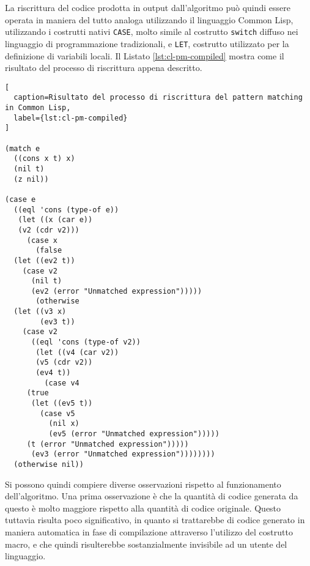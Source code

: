 La riscrittura del codice prodotta in output dall'algoritmo può quindi essere
operata in maniera del tutto analoga utilizzando il linguaggio Common Lisp,
utilizzando i costrutti nativi \texttt{CASE}, molto simile al costrutto
\texttt{switch} diffuso nei linguaggio di programmazione tradizionali, e
\texttt{LET}, costrutto utilizzato per la definizione di variabili locali. Il
Listato \ref{lst:cl-pm-compiled} mostra come il risultato del processo di
riscrittura appena descritto.

\newpage


\begin{lstlisting}[
  caption=Risultato del processo di riscrittura del pattern matching in Common Lisp,
  label={lst:cl-pm-compiled}
]

(match e
  ((cons x t) x)
  (nil t)
  (z nil))

(case e
  ((eql 'cons (type-of e))
   (let ((x (car e))
   (v2 (cdr v2)))
     (case x
       (false
  (let ((ev2 t))
    (case v2
      (nil t)
      (ev2 (error "Unmatched expression")))))
       (otherwise
  (let ((v3 x)
        (ev3 t))
    (case v2
      ((eql 'cons (type-of v2))
       (let ((v4 (car v2))
       (v5 (cdr v2))
       (ev4 t))
         (case v4
     (true
      (let ((ev5 t))
        (case v5
          (nil x)
          (ev5 (error "Unmatched expression")))))
     (t (error "Unmatched expression")))))
      (ev3 (error "Unmatched expression"))))))))
  (otherwise nil))

\end{lstlisting}

\newpage

Si possono quindi compiere diverse osservazioni rispetto al funzionamento
dell'algoritmo. Una prima osservazione è che la quantità di codice generata da
questo è molto maggiore rispetto alla quantità di codice originale. Questo
tuttavia risulta poco significativo, in quanto si trattarebbe di codice generato
in maniera automatica in fase di compilazione attraverso l'utilizzo del
costrutto macro, e che quindi risulterebbe sostanzialmente invisibile ad un
utente del linguaggio.

